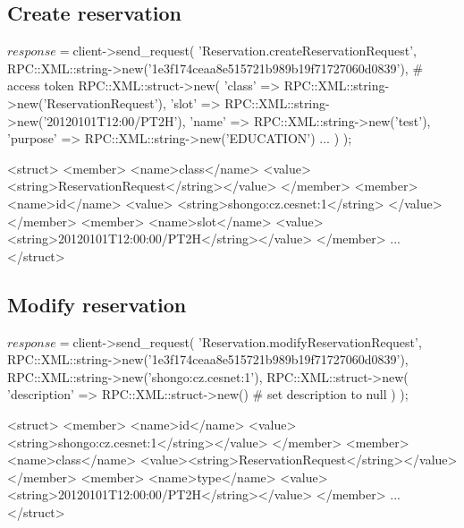 \newpage
\subsection{Create reservation}
\begin{PerlCmd}
$response = $client->send_request(
    'Reservation.createReservationRequest',
    RPC::XML::string->new('1e3f174ceaa8e515721b989b19f71727060d0839'), # access token
    RPC::XML::struct->new(
        'class' => RPC::XML::string->new('ReservationRequest'),
        'slot' => RPC::XML::string->new('20120101T12:00/PT2H'),
        'name' => RPC::XML::string->new('test'),
        'purpose' => RPC::XML::string->new('EDUCATION')
        ...
    )
);
\end{PerlCmd}
\begin{PerlResponse}
<struct>
  <member>
    <name>class</name>
    <value><string>ReservationRequest</string></value>
  </member>
  <member>
    <name>id</name>
    <value>
      <string>shongo:cz.cesnet:1</string>
    </value>
  </member>
  <member>
    <name>slot</name>
    <value><string>20120101T12:00:00/PT2H</string></value>
  </member>
  ...
</struct>
\end{PerlResponse}

\newpage
\subsection{Modify reservation}
\begin{PerlCmd}
$response = $client->send_request(
    'Reservation.modifyReservationRequest',
    RPC::XML::string->new('1e3f174ceaa8e515721b989b19f71727060d0839'),
    RPC::XML::string->new('shongo:cz.cesnet:1'),
    RPC::XML::struct->new(
        'description' => RPC::XML::struct->new() # set description to null
    )
);
\end{PerlCmd}
\begin{PerlResponse}
<struct>
  <member>
    <name>id</name>
    <value><string>shongo:cz.cesnet:1</string></value>
  </member>
  <member>
    <name>class</name>
    <value><string>ReservationRequest</string></value>
  </member>
  <member>
    <name>type</name>
    <value><string>20120101T12:00:00/PT2H</string></value>    
  </member>
  ...
</struct>
\end{PerlResponse}

\newpage
